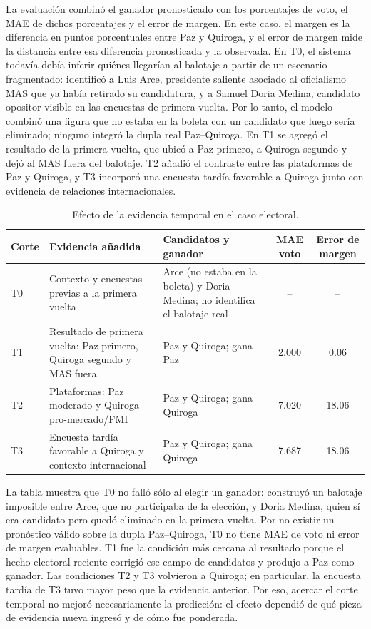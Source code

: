 ﻿\documentclass{article}
\begin{document}
La evaluación combinó el ganador pronosticado con los porcentajes de voto, el MAE de dichos porcentajes y el error de margen. En este caso, el margen es la diferencia en puntos porcentuales entre Paz y Quiroga, y el error de margen mide la distancia entre esa diferencia pronosticada y la observada. En T0, el sistema todavía debía inferir quiénes llegarían al balotaje a partir de un escenario fragmentado: identificó a Luis Arce, presidente saliente asociado al oficialismo MAS que ya había retirado su candidatura, y a Samuel Doria Medina, candidato opositor visible en las encuestas de primera vuelta. Por lo tanto, el modelo combinó una figura que no estaba en la boleta con un candidato que luego sería eliminado; ninguno integró la dupla real Paz--Quiroga. En T1 se agregó el resultado de la primera vuelta, que ubicó a Paz primero, a Quiroga segundo y dejó al MAS fuera del balotaje. T2 añadió el contraste entre las plataformas de Paz y Quiroga, y T3 incorporó una encuesta tardía favorable a Quiroga junto con evidencia de relaciones internacionales.

\begin{table}[H]
    \centering
    \small
    \begin{tabular}{@{}lp{4.8cm}p{4.3cm}cc@{}}
        \toprule
        \textbf{Corte} & \textbf{Evidencia añadida} & \textbf{Candidatos y ganador} & \textbf{MAE voto} & \textbf{Error de margen} \\ \midrule
        T0 & Contexto y encuestas previas a la primera vuelta & Arce (no estaba en la boleta) y Doria Medina; no identifica el balotaje real & -- & -- \\
        T1 & Resultado de primera vuelta: Paz primero, Quiroga segundo y MAS fuera & Paz y Quiroga; gana Paz & 2.000 & 0.06 \\
        T2 & Plataformas: Paz moderado y Quiroga pro-mercado/FMI & Paz y Quiroga; gana Quiroga & 7.020 & 18.06 \\
        T3 & Encuesta tardía favorable a Quiroga y contexto internacional & Paz y Quiroga; gana Quiroga & 7.687 & 18.06 \\ \bottomrule
    \end{tabular}
    \caption{Efecto de la evidencia temporal en el caso electoral.}
    \label{tab:seed_bolivia}
\end{table}

La tabla muestra que T0 no falló sólo al elegir un ganador: construyó un balotaje imposible entre Arce, que no participaba de la elección, y Doria Medina, quien sí era candidato pero quedó eliminado en la primera vuelta. Por no existir un pronóstico válido sobre la dupla Paz--Quiroga, T0 no tiene MAE de voto ni error de margen evaluables. T1 fue la condición más cercana al resultado porque el hecho electoral reciente corrigió ese campo de candidatos y produjo a Paz como ganador. Las condiciones T2 y T3 volvieron a Quiroga; en particular, la encuesta tardía de T3 tuvo mayor peso que la evidencia anterior. Por eso, acercar el corte temporal no mejoró necesariamente la predicción: el efecto dependió de qué pieza de evidencia nueva ingresó y de cómo fue ponderada.
\end{document}
